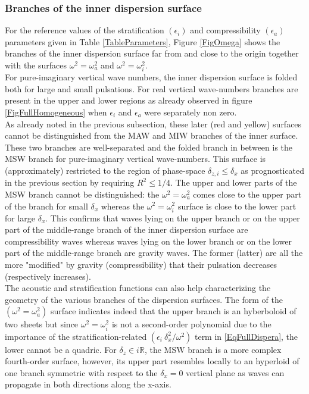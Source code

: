 \documentclass[a4paper,11pt]{article}
\begin{document}
\subsubsection{Branches of the inner dispersion surface}
For the reference values of the stratification $(\epsilon_i)$ and compressibility $(\epsilon_a)$ parameters given in Table \ref{TableParameters}, Figure \ref{FigOmega} shows the branches of the inner dispersion surface far from and close to the origin together with the surfaces $\omega^2=\omega_a^2$ and $\omega^2=\omega_i^2$.\\ 
For pure-imaginary vertical wave numbers, the inner dispersion surface is folded both for large and small pulsations. For real vertical wave-numbers branches are present in the upper and lower regions as already observed in figure \ref{FigFullHomogeneous} when $\epsilon_i$ and $\epsilon_a$ were separately non zero.\\
As already noted in the previous subsection, these later (red and yellow) surfaces cannot be distinguished from the MAW and MIW branches of the inner surface. These two branches are well-separated and the folded branch in between is the MSW branch for pure-imaginary vertical wave-numbers.  This surface is (approximately) restricted to the region of phase-space $\delta_{z,i}\leq\delta_x$ as prognosticated in the previous section by requiring $R^2\leq1/4$. The upper and lower parts of the MSW branch cannot be distinguished: the $\omega^2=\omega_a^2$ comes close to the upper part of the branch for small $\delta_x$ whereas the $\omega^2=\omega_i^2$ surface is close to the lower part for large $\delta_x$. This confirms that waves lying on the upper branch or on the upper part of the middle-range branch of the inner dispersion surface are compressibility waves whereas waves lying on the lower branch or on the lower part of the middle-range branch are gravity waves. The former (latter) are all the more "modified" by gravity (compressibility) that their pulsation decreases (respectively increases).\\
The acoustic and stratification functions can also help characterizing the geometry of the various branches of the dispersion surfaces. The form of the $(\omega^2=\omega_a^2)$ surface indicates indeed that the upper branch is an hyberboloid of two sheets but since $\omega^2=\omega_i^2$ is not a second-order polynomial due to the importance of the stratification-related $(\epsilon_i\ \delta_x^2 / \omega^2)$ term in \ref{EqFullDispera}, the lower cannot be a quadric. For $\delta_z\in i\mathbb{R}$, the MSW branch is a more complex fourth-order surface, however, its upper part resembles locally to an hyperloid of one branch symmetric with respect to the $\delta_x = 0$ vertical plane as waves can propagate in both directions along the x-axis.\\
\end{document}
